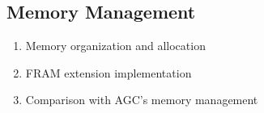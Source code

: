 \subsection{Memory Management}

\begin{enumerate}
    \item Memory organization and allocation
    \item FRAM extension implementation
    \item Comparison with AGC's memory management 
\end{enumerate}
